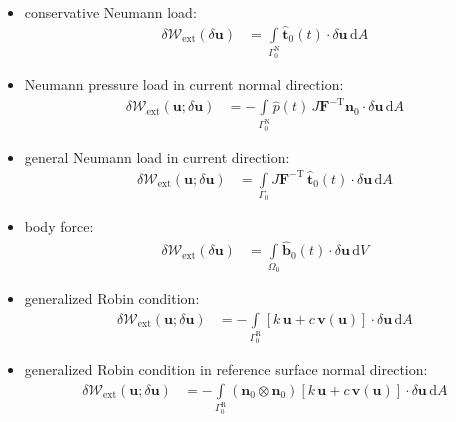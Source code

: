 \documentclass[a4paper,12pt]{report}
\newcommand{\bs}[1]{\boldsymbol{#1}}
\newcommand{\Om}{\mathit{\Omega}}
\newcommand{\Gm}{\mathit{\Gamma}}
\begin{document}
\begin{itemize}
\item conservative Neumann load:
\begin{equation}
\label{equation-deltaw-ext-pk1}
\begin{aligned}
\delta \mathcal{W}_{\mathrm{ext}}(\delta\bs{u}) &= \int\limits_{\Gm_{0}^{\mathrm{N}}} \hat{\bs{t}}_{0}(t) \cdot \delta\bs{u} \,\mathrm{d}A
\end{aligned}
\end{equation}
\item Neumann pressure load in current normal direction:
\begin{equation}
\label{equation-deltaw-ext-cur-p}
\begin{aligned}
\delta \mathcal{W}_{\mathrm{ext}}(\bs{u};\delta\bs{u}) &= -\int\limits_{\Gm_{0}^{\mathrm{N}}} \hat{p}(t)\,J \bs{F}^{-\mathrm{T}}\bs{n}_{0} \cdot \delta\bs{u} \,\mathrm{d}A \end{aligned}
\end{equation}
\item general Neumann load in current direction:
\begin{equation}
\label{equation-deltaw-ext-cur}
\begin{aligned}
\delta \mathcal{W}_{\mathrm{ext}}(\bs{u};\delta\bs{u}) &= \int\limits_{\Gm_0} J\boldsymbol{F}^{-\mathrm{T}}\,\hat{\boldsymbol{t}}_{0}(t) \cdot \delta\boldsymbol{u} \,\mathrm{d}A
\end{aligned}
\end{equation}
\item body force:
\begin{equation}
\label{equation-deltaw-ext-body}
\begin{aligned}
\delta \mathcal{W}_{\mathrm{ext}}(\delta\bs{u}) &= \int\limits_{\Om_{0}} \hat{\bs{b}}_{0}(t) \cdot \delta\bs{u} \,\mathrm{d}V
\end{aligned}
\end{equation}

\item generalized Robin condition:
\begin{equation}
\label{equation-deltaw-ext-robin}
\begin{aligned}
\delta \mathcal{W}_{\mathrm{ext}}(\bs{u};\delta\bs{u}) &= -\int\limits_{\Gm_{0}^{\mathrm{R}}} \left[k\,\bs{u} + c\,\bs{v}(\bs{u})\right] \cdot \delta\bs{u}\,\mathrm{d}A
\end{aligned}
\end{equation}
\item generalized Robin condition in reference surface normal direction:
\begin{equation}
\label{equation-deltaw-ext-robin-n}
\begin{aligned}
\delta \mathcal{W}_{\mathrm{ext}}(\bs{u};\delta\bs{u}) &= -\int\limits_{\Gm_{0}^{\mathrm{R}}} (\bs{n}_0 \otimes \bs{n}_0)\left[k\,\bs{u} + c\,\bs{v}(\bs{u})\right] \cdot \delta\bs{u}\,\mathrm{d}A
\end{aligned}
\end{equation}


\end{itemize}
\end{document}
